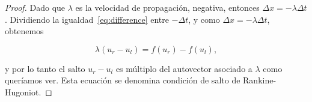 \begin{proof}
  Dado que $\lambda$ es la velocidad de propagación, negativa,
  entonces $\Delta x=-\lambda\Delta t$.
  Dividiendo la igualdad~\eqref{eq:difference} entre $-\Delta t$, y
  como $\Delta x=-\lambda\Delta t$, obtenemos

  \begin{equation*}
    \lambda\left(u_{r}-u_{l}\right)=
    f\left(u_{r}\right)-
    f\left(u_{l}\right),
  \end{equation*}

  y por lo tanto el salto $u_{r}-u_{l}$ es múltiplo del autovector
  asociado a $\lambda$ como queríamos ver.
  Esta ecuación se denomina condición de salto de Rankine-Hugoniot.
\end{proof}